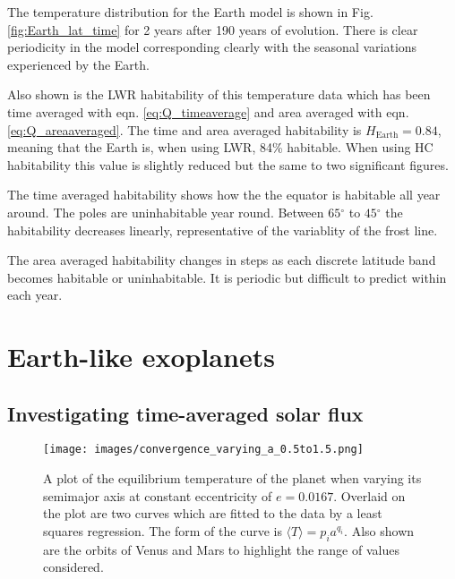 \documentclass[12pt, onecolumn]{revtex4-2}    %
\newcommand{\degrees}{\ensuremath{^{\circ}}}
\begin{document}
The temperature distribution for the Earth model is shown in Fig. \ref{fig:Earth_lat_time} for 2 years after 190 years of evolution.
There is clear periodicity in the model corresponding clearly with the seasonal variations experienced by the Earth.

Also shown is the LWR habitability of this temperature data which has been time averaged with eqn. \eqref{eq:Q_timeaverage} and area averaged with eqn. \eqref{eq:Q_areaaveraged}.
The time and area averaged habitability is $H_\text{Earth} = 0.84$, meaning that the Earth is, when using LWR, 84\% habitable.
When using HC habitability this value is slightly reduced but the same to two significant figures.

The time averaged habitability shows how the the equator is habitable all year around.
The poles are uninhabitable year round.
Between $65\degrees$ to $45\degrees$ the habitability decreases linearly, representative of the variablity of the frost line.

The area averaged habitability changes in steps as each discrete latitude band becomes habitable or uninhabitable.
It is periodic but difficult to predict within each year.

\section{Earth-like exoplanets} \label{sec:Exoplanets}
\subsection{Investigating time-averaged solar flux} \label{ssec:InvTimeAveragedSolarFlux}

\begin{figure}
  \texttt{[image: images/convergence\_varying\_a\_0.5to1.5.png]}
  \caption{
    A plot of the equilibrium temperature of the planet when varying its semimajor axis at constant eccentricity of $e=0.0167$.
    Overlaid on the plot are two curves which are fitted to the data by a least squares regression.
    The form of the curve is $\langle T \rangle = p_i a^{q_i}$.
    Also shown are the orbits of Venus and Mars to highlight the range of values considered.
  }
  \label{fig:planet_semimajoraxis}
\end{figure}
\end{document}
